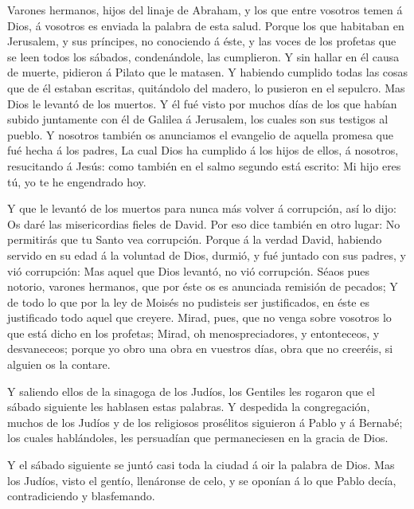  Varones hermanos, hijos del linaje de Abraham, y los que
entre vosotros temen á Dios, á vosotros es enviada la palabra de esta
salud.  Porque los que habitaban en Jerusalem, y sus
príncipes, no conociendo á éste, y las voces de los profetas que se leen
todos los sábados, condenándole, las cumplieron.  Y sin
hallar en él causa de muerte, pidieron á Pilato que le matasen.
 Y habiendo cumplido todas las cosas que de él estaban
escritas, quitándolo del madero, lo pusieron en el sepulcro.
 Mas Dios le levantó de los muertos.  Y él fué
visto por muchos días de los que habían subido juntamente con él de
Galilea á Jerusalem, los cuales son sus testigos al pueblo.
 Y nosotros también os anunciamos el evangelio de aquella
promesa que fué hecha á los padres,  La cual Dios ha
cumplido á los hijos de ellos, á nosotros, resucitando á Jesús: como
también en el salmo segundo está escrito: Mi hijo eres tú, yo te he
engendrado hoy.

 Y que le levantó de los muertos para nunca más volver á
corrupción, así lo dijo: Os daré las misericordias fieles de David.
 Por eso dice también en otro lugar: No permitirás que tu
Santo vea corrupción.  Porque á la verdad David, habiendo
servido en su edad á la voluntad de Dios, durmió, y fué juntado con sus
padres, y vió corrupción:  Mas aquel que Dios levantó, no
vió corrupción.  Séaos pues notorio, varones hermanos, que
por éste os es anunciada remisión de pecados;  Y de todo lo
que por la ley de Moisés no pudisteis ser justificados, en éste es
justificado todo aquel que creyere.  Mirad, pues, que no
venga sobre vosotros lo que está dicho en los profetas; 
Mirad, oh menospreciadores, y entonteceos, y desvaneceos; porque yo obro
una obra en vuestros días, obra que no creeréis, si alguien os la
contare.

 Y saliendo ellos de la sinagoga de los Judíos, los
Gentiles les rogaron que el sábado siguiente les hablasen estas
palabras.  Y despedida la congregación, muchos de los
Judíos y de los religiosos prosélitos siguieron á Pablo y á Bernabé; los
cuales hablándoles, les persuadían que permaneciesen en la gracia de
Dios.

 Y el sábado siguiente se juntó casi toda la ciudad á oir
la palabra de Dios.  Mas los Judíos, visto el gentío,
llenáronse de celo, y se oponían á lo que Pablo decía, contradiciendo y
blasfemando.

